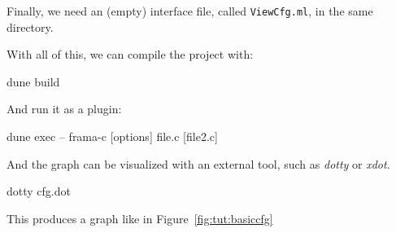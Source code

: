

Finally, we need an (empty) interface file, called \texttt{ViewCfg.ml}, in
the same directory.

With all of this, we can compile the project with:

\begin{shell}
  dune build
\end{shell}

And run it as a \framac plugin:

\begin{frama-c-commands}
  dune exec -- frama-c [options] file.c [file2.c]
\end{frama-c-commands}

And the graph can be visualized with an external tool, such as {\em dotty} or
{\em xdot}.
\begin{shell}
  dotty cfg.dot
\end{shell}

This produces a graph like in Figure~\ref{fig:tut:basiccfg}

